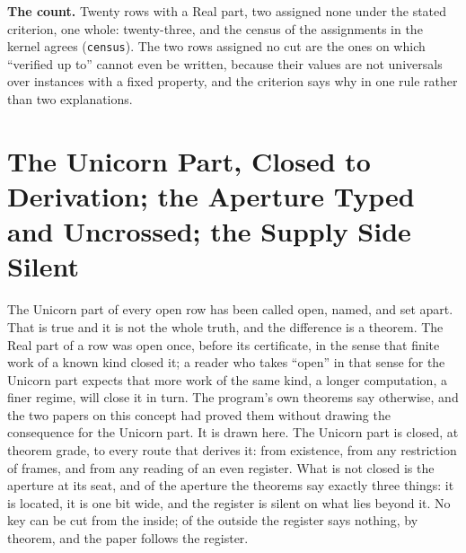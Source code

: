 \documentclass[10pt]{article}
\begin{document}
\textbf{The count.} Twenty rows with a Real part, two assigned none
under the stated criterion, one whole: twenty-three, and the census of
the assignments in the kernel agrees (\texttt{census}). The two rows
assigned no cut are the ones on which ``verified up to'' cannot even be
written, because their values are not universals over instances with a
fixed property, and the criterion says why in one rule rather than two
explanations.

\hypertarget{the-unicorn-part-closed-to-derivation-the-aperture-typed-and-uncrossed-the-supply-side-silent}{%
\section{The Unicorn Part, Closed to Derivation; the Aperture Typed and
Uncrossed; the Supply Side
Silent}\label{the-unicorn-part-closed-to-derivation-the-aperture-typed-and-uncrossed-the-supply-side-silent}}

The Unicorn part of every open row has been called open, named, and set
apart. That is true and it is not the whole truth, and the difference is
a theorem. The Real part of a row was open once, before its certificate,
in the sense that finite work of a known kind closed it; a reader who
takes ``open'' in that sense for the Unicorn part expects that more work
of the same kind, a longer computation, a finer regime, will close it in
turn. The program's own theorems say otherwise, and the two papers on
this concept had proved them without drawing the consequence for the
Unicorn part. It is drawn here. The Unicorn part is closed, at theorem
grade, to every route that derives it: from existence, from any
restriction of frames, and from any reading of an even register. What is
not closed is the aperture at its seat, and of the aperture the theorems
say exactly three things: it is located, it is one bit wide, and the
register is silent on what lies beyond it. No key can be cut from the
inside; of the outside the register says nothing, by theorem, and the
paper follows the register.
\end{document}
